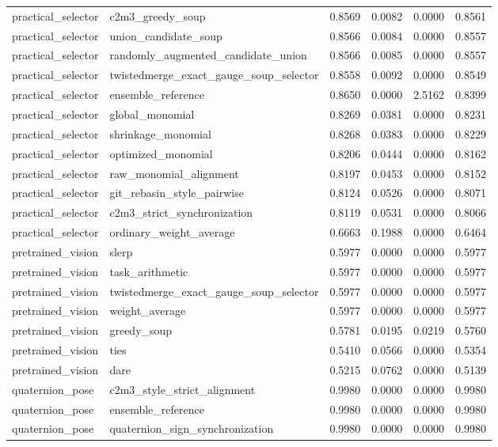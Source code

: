 \begin{tabular}{llrrrr}
practical_selector & c2m3_greedy_soup & 0.8569 & 0.0082 & 0.0000 & 0.8561 \\
practical_selector & union_candidate_soup & 0.8566 & 0.0084 & 0.0000 & 0.8557 \\
practical_selector & randomly_augmented_candidate_union & 0.8566 & 0.0085 & 0.0000 & 0.8557 \\
practical_selector & twistedmerge_exact_gauge_soup_selector & 0.8558 & 0.0092 & 0.0000 & 0.8549 \\
practical_selector & ensemble_reference & 0.8650 & 0.0000 & 2.5162 & 0.8399 \\
practical_selector & global_monomial & 0.8269 & 0.0381 & 0.0000 & 0.8231 \\
practical_selector & shrinkage_monomial & 0.8268 & 0.0383 & 0.0000 & 0.8229 \\
practical_selector & optimized_monomial & 0.8206 & 0.0444 & 0.0000 & 0.8162 \\
practical_selector & raw_monomial_alignment & 0.8197 & 0.0453 & 0.0000 & 0.8152 \\
practical_selector & git_rebasin_style_pairwise & 0.8124 & 0.0526 & 0.0000 & 0.8071 \\
practical_selector & c2m3_strict_synchronization & 0.8119 & 0.0531 & 0.0000 & 0.8066 \\
practical_selector & ordinary_weight_average & 0.6663 & 0.1988 & 0.0000 & 0.6464 \\
pretrained_vision & slerp & 0.5977 & 0.0000 & 0.0000 & 0.5977 \\
pretrained_vision & task_arithmetic & 0.5977 & 0.0000 & 0.0000 & 0.5977 \\
pretrained_vision & twistedmerge_exact_gauge_soup_selector & 0.5977 & 0.0000 & 0.0000 & 0.5977 \\
pretrained_vision & weight_average & 0.5977 & 0.0000 & 0.0000 & 0.5977 \\
pretrained_vision & greedy_soup & 0.5781 & 0.0195 & 0.0219 & 0.5760 \\
pretrained_vision & ties & 0.5410 & 0.0566 & 0.0000 & 0.5354 \\
pretrained_vision & dare & 0.5215 & 0.0762 & 0.0000 & 0.5139 \\
quaternion_pose & c2m3_style_strict_alignment & 0.9980 & 0.0000 & 0.0000 & 0.9980 \\
quaternion_pose & ensemble_reference & 0.9980 & 0.0000 & 0.0000 & 0.9980 \\
quaternion_pose & quaternion_sign_synchronization & 0.9980 & 0.0000 & 0.0000 & 0.9980 \\

\end{tabular}
